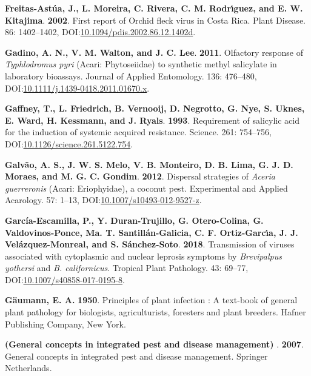 \documentclass[12pt,final,CPage]{ufthesis}
\newlength{\cslhangindent}
\newenvironment{CSLReferences}[2] %
{%
	\setlength{\parindent}{0pt}
	\ifodd #1 \everypar{\setlength{\hangindent}{\cslhangindent}}\ignorespaces\fi
	\ifnum #2 > 0
	\setlength{\parskip}{#2\baselineskip}
	\fi
}%
{}
\begin{document}
{\begin{CSLReferences}{1}{0}
  \leavevmode{}%
  \textbf{Freitas-Astúa, J., L. Moreira, C. Rivera, C. M. Rodrı́guez, and E. W. Kitajima}. \textbf{2002}. First report of {Orchid fleck virus} in {Costa Rica}. Plant Disease. 86: 1402--1402, DOI:\href{https://doi.org/10.1094/pdis.2002.86.12.1402d}{10.1094/pdis.2002.86.12.1402d}.

  \leavevmode{}%
  \textbf{Gadino, A. N., V. M. Walton, and J. C. Lee}. \textbf{2011}. Olfactory response of {\emph{Typhlodromus pyri}} {({Acari}: {Phytoseiidae})} to synthetic methyl salicylate in laboratory bioassays. Journal of Applied Entomology. 136: 476--480, DOI:\href{https://doi.org/10.1111/j.1439-0418.2011.01670.x}{10.1111/j.1439-0418.2011.01670.x}.

  \leavevmode{}%
  \textbf{Gaffney, T., L. Friedrich, B. Vernooij, D. Negrotto, G. Nye, S. Uknes, E. Ward, H. Kessmann, and J. Ryals}. \textbf{1993}. Requirement of salicylic acid for the induction of systemic acquired resistance. Science. 261: 754--756, DOI:\href{https://doi.org/10.1126/science.261.5122.754}{10.1126/science.261.5122.754}.

  \leavevmode{}%
  \textbf{Galvão, A. S., J. W. S. Melo, V. B. Monteiro, D. B. Lima, G. J. D. Moraes, and M. G. C. Gondim}. \textbf{2012}. Dispersal strategies of {\emph{Aceria guerreronis}} ({Acari}: {Eriophyidae}), a coconut pest. Experimental and Applied Acarology. 57: 1--13, DOI:\href{https://doi.org/10.1007/s10493-012-9527-z}{10.1007/s10493-012-9527-z}.

  \leavevmode{}%
  \textbf{García-Escamilla, P., Y. Duran-Trujillo, G. Otero-Colina, G. Valdovinos-Ponce, Ma. T. Santillán-Galicia, C. F. Ortiz-Garcı́a, J. J. Velázquez-Monreal, and S. Sánchez-Soto}. \textbf{2018}. Transmission of viruses associated with cytoplasmic and nuclear leprosis symptoms by {\emph{Brevipalpus yothersi}} and {\emph{B. californicus}}. Tropical Plant Pathology. 43: 69--77, DOI:\href{https://doi.org/10.1007/s40858-017-0195-8}{10.1007/s40858-017-0195-8}.

  \leavevmode{}%
  \textbf{Gäumann, E. A.} \textbf{1950}. Principles of plant infection : A text-book of general plant pathology for biologists, agriculturists, foresters and plant breeders. Hafner Publishing Company, New York.

  \leavevmode{}%
  \textbf{(General concepts in integrated pest and disease management) }. \textbf{2007}. General concepts in integrated pest and disease management. Springer Netherlands.


\end{CSLReferences}}
\end{document}
